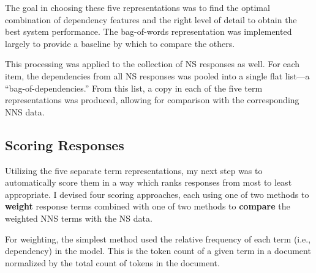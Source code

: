 The goal in choosing these five representations was to find the optimal combination of dependency features and the right level of detail to obtain the best system performance. The bag-of-words representation was implemented largely to provide a baseline by which to compare the others.

This processing was applied to the collection of NS responses as well. For each item, the dependencies from all NS responses was pooled into a single flat list---a ``bag-of-dependencies.'' From this list, a copy in each of the five term representations was produced, allowing for comparison with the corresponding NNS data.


\subsection{Scoring Responses}
\label{sec:scoring}

Utilizing the five separate term representations, my next step was to automatically score them in a way which ranks responses from most to least appropriate.  I devised four scoring approaches, each using one of two methods to \textbf{weight} response terms combined with one of two methods to \textbf{compare} the weighted NNS terms with the NS data.

For weighting, the simplest method used the relative frequency of each term (i.e., dependency) in the model. This is the token count of a given term in a document normalized by the total count of tokens in the document.

